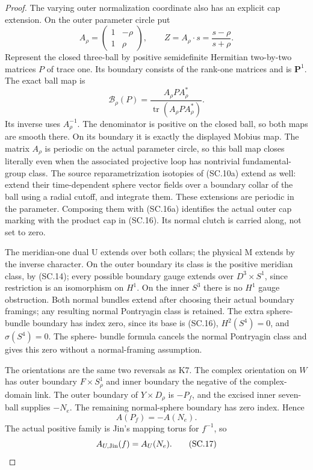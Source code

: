 \begin{proof}
The varying outer normalization coordinate also has an explicit cap
extension. On the outer parameter circle put
\[
 A_\rho=\begin{pmatrix}1&-\rho\\1&\rho\end{pmatrix},
 \qquad Z=A_\rho\cdot s=\frac{s-\rho}{s+\rho}.
\]
Represent the closed three-ball by positive semidefinite Hermitian
two-by-two matrices \(P\) of trace one. Its boundary consists of the
rank-one matrices and is \(\mathbf P^1\). The exact ball map is
\[
 \mathcal B_\rho(P)
       =\frac{A_\rho P A_\rho^*}
                    {\operatorname{tr}(A_\rho P A_\rho^*)}.
                                                               \tag{SC.16a}
\]
Its inverse uses \(A_\rho^{-1}\). The denominator is positive on the
closed ball, so both maps are smooth there. On its boundary it is
exactly the displayed Mobius map. The matrix \(A_\rho\) is periodic
on the actual parameter circle, so this ball map closes literally even
when the associated projective loop has nontrivial fundamental-group
class. The source reparametrization isotopies of (SC.10a) extend as
well: extend their time-dependent sphere vector fields over a boundary
collar of the ball using a radial cutoff, and integrate them. These
extensions are periodic in the parameter. Composing them with
(SC.16a) identifies the actual outer cap marking with the product cap
in (SC.16). Its normal clutch is carried along, not set to zero.

The meridian-one dual U extends over both collars; the physical M extends by the inverse character. On the outer boundary
its class is the positive meridian class, by (SC.14); every possible
boundary gauge extends over \(D^3\times S^1\), since restriction is
an isomorphism on \(H^1\). On the inner \(S^3\) there is no
\(H^1\) gauge obstruction. Both normal bundles extend after choosing
their actual boundary framings; any resulting normal Pontryagin class
is retained. The extra sphere-bundle boundary has index zero, since its
base is (SC.16), \(H^2(S^4)=0\), and \(\sigma(S^4)=0\). The sphere-
bundle formula cancels the normal Pontryagin class and gives this zero
without a normal-framing assumption.

The orientations are the same two reversals as K7. The complex
orientation on \(W\) has outer boundary \(F\times S^1_\rho\) and
inner boundary the negative of the complex-domain link. The outer
boundary of \(Y\times D_\rho\) is \(-P_f\), and the excised inner
seven-ball supplies \(-N_e\). The remaining normal-sphere boundary
has zero index. Hence
\[
                         A(P_f)=-A(N_e).
\]
The actual positive family is Jin's mapping torus for \(f^{-1}\), so
\[
                         A_{U,\rm Jin}(f)=A_U(N_e).      \tag{SC.17}
\]


\end{proof}
